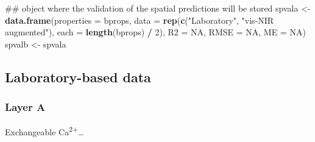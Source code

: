 \documentclass[]{book}
\newenvironment{Shaded}{\begin{snugshade}}{\end{snugshade}}
\newcommand{\DataTypeTok}[1]{\textcolor[rgb]{0.13,0.29,0.53}{#1}}
\newcommand{\DecValTok}[1]{\textcolor[rgb]{0.00,0.00,0.81}{#1}}
\newcommand{\FloatTok}[1]{\textcolor[rgb]{0.00,0.00,0.81}{#1}}
\newcommand{\KeywordTok}[1]{\textcolor[rgb]{0.13,0.29,0.53}{\textbf{#1}}}
\newcommand{\NormalTok}[1]{#1}
\newcommand{\OperatorTok}[1]{\textcolor[rgb]{0.81,0.36,0.00}{\textbf{#1}}}
\newcommand{\OtherTok}[1]{\textcolor[rgb]{0.56,0.35,0.01}{#1}}
\newcommand{\StringTok}[1]{\textcolor[rgb]{0.31,0.60,0.02}{#1}}
\begin{document}
\begin{Shaded}
\begin{Highlighting}[]
\NormalTok{## object where the validation of the spatial predictions will be stored }
\NormalTok{spvala <-}\StringTok{ }\KeywordTok{data.frame}\NormalTok{(}\DataTypeTok{properties =}\NormalTok{ bprops,}
                     \DataTypeTok{data =} \KeywordTok{rep}\NormalTok{(}\KeywordTok{c}\NormalTok{(}\StringTok{"Laboratory"}\NormalTok{, }\StringTok{"vis-NIR augmented"}\NormalTok{), }
                                \DataTypeTok{each =} \KeywordTok{length}\NormalTok{(bprops) }\OperatorTok{/}\StringTok{ }\DecValTok{2}\NormalTok{),}
                     \DataTypeTok{R2 =} \OtherTok{NA}\NormalTok{,}
                     \DataTypeTok{RMSE =} \OtherTok{NA}\NormalTok{,}
                     \DataTypeTok{ME =} \OtherTok{NA}\NormalTok{)}
\NormalTok{spvalb <-}\StringTok{ }\NormalTok{spvala}
\end{Highlighting}
\end{Shaded}

\hypertarget{laboratory-based-data-1}{%
\subsection{Laboratory-based data}\label{laboratory-based-data-1}}

\hypertarget{layer-a-2}{%
\subsubsection{Layer A}\label{layer-a-2}}

Exchangeable Ca\textsuperscript{2+}\ldots{}

\begin{Shaded}
\end{Shaded}
\end{document}
